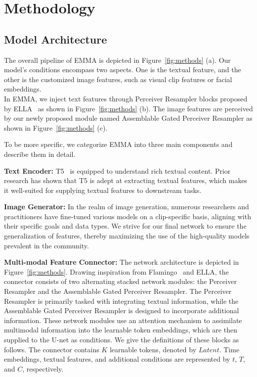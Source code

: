 \section{Methodology}\label{sec:method}


\subsection{Model Architecture}

The overall pipeline of EMMA is depicted in Figure~\ref{fig:methods} (a). 
Our model's conditions encompass two aspects. One is the textual feature, and the other is the customized image features, such as visual clip features or facial embeddings.\\
In EMMA, we inject text features through Perceiver Resampler blocks proposed by ELLA~\cite{hu2024ella} as shown in Figure~\ref{fig:methods} (b). 
The image features are perceived by our newly proposed module named Assemblable Gated Perceiver Resampler as shown in Figure~\ref{fig:methods} (c).

To be more specific, we categorize EMMA into three main components and describe them in detail. 

\textbf{Text Encoder:} T5~\cite{chung2024scaling} is equipped to understand rich textual content. Prior research has shown that T5 is adept at extracting textual features, which makes it well-suited for supplying textual features to downstream tasks.

\textbf{Image Generator:} In the realm of image generation, numerous researchers and practitioners have fine-tuned various models on a clip-specific basis, aligning with their specific goals and data types. We strive for our final network to ensure the generalization of features, thereby maximizing the use of the high-quality models prevalent in the community.

\textbf{Multi-modal Feature Connector:} The network architecture is depicted in Figure~\ref{fig:methods}. Drawing inspiration from Flamingo~\cite{alayrac2022flamingo} and ELLA, the connector consists of two alternating stacked network modules: the Perceiver Resampler and the Assemblable Gated Perceiver Resampler. 
The Perceiver Resampler is primarily tasked with integrating textual information, while the Assemblable Gated Perceiver Resampler is designed to incorporate additional information. These network modules use an attention mechanism to assimilate multimodal information into the learnable token embeddings, which are then supplied to the U-net as conditions.
We give the definitions of these blocks as follows. The connector contains $K$ learnable tokens, denoted by $Latent$. Time embeddings, textual features, and additional conditions are represented by $t$, $T$, and $C$, respectively.

